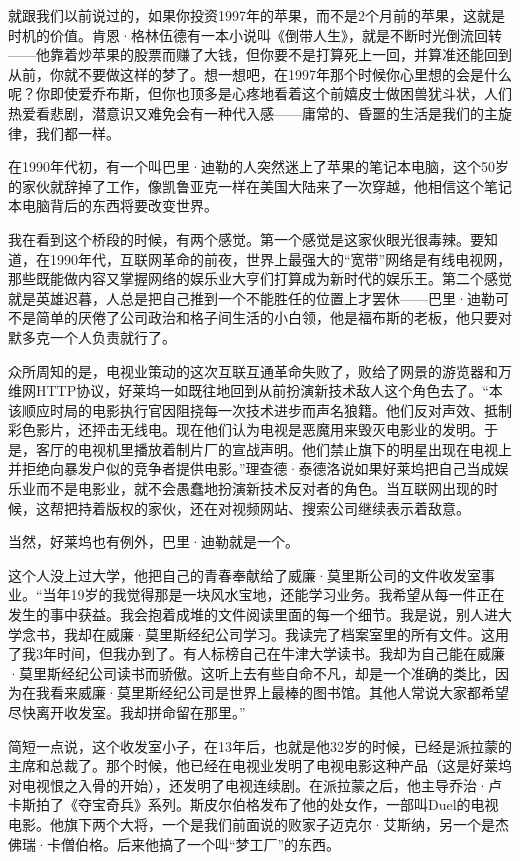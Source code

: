就跟我们以前说过的，如果你投资1997年的苹果，而不是2个月前的苹果，这就是时机的价值。肯恩·格林伍德有一本小说叫《倒带人生》，就是不断时光倒流回转------他靠着炒苹果的股票而赚了大钱，但你要不是打算死上一回，并算准还能回到从前，你就不要做这样的梦了。想一想吧，在1997年那个时候你心里想的会是什么呢？你即使爱乔布斯，但你也顶多是心疼地看着这个前嬉皮士做困兽犹斗状，人们热爱看悲剧，潜意识又难免会有一种代入感------庸常的、昏噩的生活是我们的主旋律，我们都一样。

在1990年代初，有一个叫巴里·迪勒的人突然迷上了苹果的笔记本电脑，这个50岁的家伙就辞掉了工作，像凯鲁亚克一样在美国大陆来了一次穿越，他相信这个笔记本电脑背后的东西将要改变世界。

我在看到这个桥段的时候，有两个感觉。第一个感觉是这家伙眼光很毒辣。要知道，在1990年代，互联网革命的前夜，世界上最强大的``宽带''网络是有线电视网，那些既能做内容又掌握网络的娱乐业大亨们打算成为新时代的娱乐王。第二个感觉就是英雄迟暮，人总是把自己推到一个不能胜任的位置上才罢休------巴里·迪勒可不是简单的厌倦了公司政治和格子间生活的小白领，他是福布斯的老板，他只要对默多克一个人负责就行了。

众所周知的是，电视业策动的这次互联互通革命失败了，败给了网景的游览器和万维网HTTP协议，好莱坞一如既往地回到从前扮演新技术敌人这个角色去了。``本该顺应时局的电影执行官因阻挠每一次技术进步而声名狼籍。他们反对声效、抵制彩色影片，还抨击无线电。现在他们认为电视是恶魔用来毁灭电影业的发明。于是，客厅的电视机里播放着制片厂的宣战声明。他们禁止旗下的明星出现在电视上并拒绝向暴发户似的竞争者提供电影。''理查德·泰德洛说如果好莱坞把自己当成娱乐业而不是电影业，就不会愚蠢地扮演新技术反对者的角色。当互联网出现的时候，这帮把持着版权的家伙，还在对视频网站、搜索公司继续表示着敌意。

当然，好莱坞也有例外，巴里·迪勒就是一个。

这个人没上过大学，他把自己的青春奉献给了威廉·莫里斯公司的文件收发室事业。``当年19岁的我觉得那是一块风水宝地，还能学习业务。我希望从每一件正在发生的事中获益。我会抱着成堆的文件阅读里面的每一个细节。我是说，别人进大学念书，我却在威廉·莫里斯经纪公司学习。我读完了档案室里的所有文件。这用了我3年时间，但我办到了。有人标榜自己在牛津大学读书。我却为自己能在威廉·莫里斯经纪公司读书而骄傲。这听上去有些自命不凡，却是一个准确的类比，因为在我看来威廉·莫里斯经纪公司是世界上最棒的图书馆。其他人常说大家都希望尽快离开收发室。我却拼命留在那里。''

简短一点说，这个收发室小子，在13年后，也就是他32岁的时候，已经是派拉蒙的主席和总裁了。那个时候，他已经在电视业发明了电视电影这种产品（这是好莱坞对电视恨之入骨的开始），还发明了电视连续剧。在派拉蒙之后，他主导乔治·卢卡斯拍了《夺宝奇兵》系列。斯皮尔伯格发布了他的处女作，一部叫Duel的电视电影。他旗下两个大将，一个是我们前面说的败家子迈克尔·艾斯纳，另一个是杰佛瑞·卡僧伯格。后来他搞了一个叫``梦工厂''的东西。

